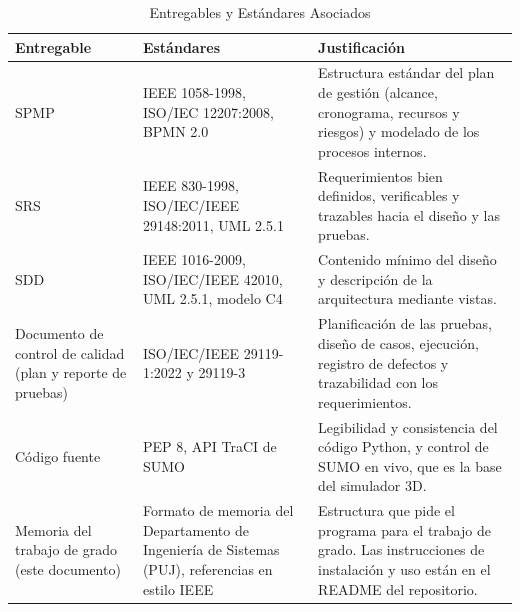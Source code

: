 \begin{table}[ht]
\renewcommand{\arraystretch}{1.2}
\centering
\small
\begin{tabular}{|p{2.6cm}|p{4.2cm}|p{7.2cm}|}
\hline
\textbf{Entregable} & \textbf{Estándares} & \textbf{Justificación} \\ \hline
SPMP & IEEE 1058-1998, ISO/IEC 12207:2008, BPMN 2.0 & Estructura estándar del plan de gestión (alcance, cronograma, recursos y riesgos) y modelado de los procesos internos. \\ \hline
SRS & IEEE 830-1998, ISO/IEC/IEEE 29148:2011, UML 2.5.1 & Requerimientos bien definidos, verificables y trazables hacia el diseño y las pruebas. \\ \hline
SDD & IEEE 1016-2009, ISO/IEC/IEEE 42010, UML 2.5.1, modelo C4 & Contenido mínimo del diseño y descripción de la arquitectura mediante vistas. \\ \hline
Documento de control de calidad (plan y reporte de pruebas) & ISO/IEC/IEEE 29119-1:2022 y 29119-3 & Planificación de las pruebas, diseño de casos, ejecución, registro de defectos y trazabilidad con los requerimientos. \\ \hline
Código fuente & PEP 8, API TraCI de SUMO & Legibilidad y consistencia del código Python, y control de SUMO en vivo, que es la base del simulador 3D. \\ \hline
Memoria del trabajo de grado (este documento) & Formato de memoria del Departamento de Ingeniería de Sistemas (PUJ), referencias en estilo IEEE & Estructura que pide el programa para el trabajo de grado. Las instrucciones de instalación y uso están en el README del repositorio. \\ \hline
\end{tabular}
\caption{Entregables y Estándares Asociados}
\label{tab:entregables}
\end{table}
